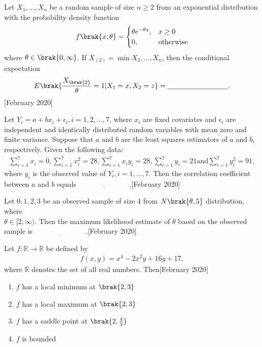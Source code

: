   \item Let $X_1, \dots, X_n$ be a random sample of size $n \geq 2$ from an exponential distribution with the probability density function
    \begin{align}
    f\brak{x; \theta} = 
    \begin{cases} 
      \theta e^{-\theta x}, & x \geq 0 \\ 
      0, & \text{otherwise} 
    \end{cases}
    \end{align}
    where $\theta \in \brak{0, \infty}$. If $X_{(2)} = \min {X_2, \dots, X_n}$, then the conditional expectation
    \begin{align}
    {E} \brak{ \frac{X_{\brak{2}}}{\theta} = 1  |  X_1 = x,  X_2 = z } = \underline{\hspace{3cm}}.
    \end{align}\hfill[February 2020]
     \item Let $Y_i = a + b x_i + \epsilon_i,i = 1, 2, \dots, 7$, where $x_i$ are fixed covariates and $\epsilon_i$ are independent and identically distributed random variables with mean zero and finite variance. Suppose that $a$ and $b$ are the least squares estimators of $a$ and $b$, respectively. Given the following data:
    \begin{align}
    \sum_{i=1}^7 x_i = 0,\sum_{i=1}^7 x_i^2 = 28,\sum_{i=1}^7 x_i y_i = 28,\sum_{i=1}^7 y_i = 21 \text{and}\sum_{i=1}^7 y_i^2 = 91,
    \end{align}
    where $y_i$ is the observed value of $Y_i, i = 1, \dots, 7$. Then the correlation coefficient between $a$ and $b$ equals $\underline{\hspace{3cm}}$.\hfill[February 2020]
     \item Let ${0, 1, 2, 3}$ be an observed sample of size $4$ from $N\brak{\theta, 5}$ distribution, where \\$\theta \in [2, \infty)$. Then the maximum likelihood estimate of $\theta$ based on the observed sample is $\underline{\hspace{3cm}}$.\hfill[February 2020]
    \item Let $f: \mathbb{R} \to \mathbb{R}$ be defined by
    \begin{align}
    f(x,y) = x^4 - 2 x^2 y + 16 y + 17,
    \end{align}
    where $\mathbb{R}$ denotes the set of all real numbers. Then\hfill[February 2020]
    \begin{enumerate}
        \item $f$ has a local minimum at $\brak{2, 3}$
        \item $f$ has a local maximum at $\brak{2, 3}$
        \item $f$ has a saddle point at $\brak{2, \frac{4}{3}}$
        \item $f$ is bounded
    \end{enumerate}

